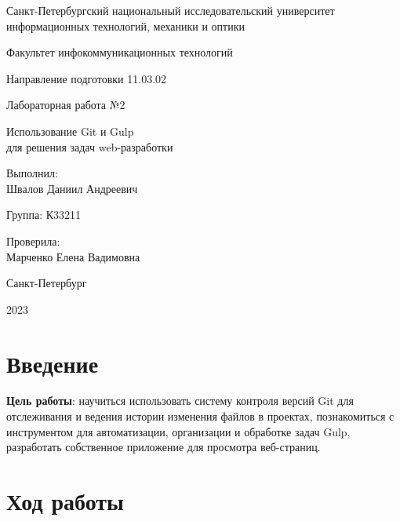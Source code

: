 \documentclass[a4paper, 14pt]{extarticle}
\begin{document}
\begin{titlepage}
  \vspace{0pt plus2fill}
  \noindent

  \vspace{0pt plus6fill}
  \begin{center}
    Санкт-Петербургский национальный исследовательский университет
    информационных технологий, механики и оптики

    \vspace{0pt plus3fill}

    Факультет инфокоммуникационных технологий

    Направление подготовки 11.03.02

    \vspace{0pt plus2fill}

    Лабораторная работа №2

    Использование Git и Gulp \\ для решения задач web-разработки

  \end{center}

  \vspace{0pt plus9fill}
  \begin{flushright}
    Выполнил: \\
    Швалов Даниил Андреевич

    Группа: К33211

    Проверила: \\
    Марченко Елена Вадимовна
  \end{flushright}

  \vspace{0pt plus2fill}
  \begin{center}
    Санкт-Петербург

    2023
  \end{center}
\end{titlepage}

\section{Введение}

\textbf{Цель работы}: научиться использовать систему контроля версий Git для
отслеживания и ведения истории изменения файлов в проектах, познакомиться с
инструментом для автоматизации, организации и обработке задач Gulp, разработать
собственное приложение для просмотра веб-страниц.

\section{Ход работы}
\end{document}

